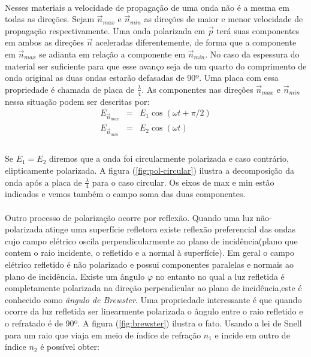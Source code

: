 \documentclass[a4paper,11pt]{article}
\begin{document}
\paragraph{}Nesses materiais a velocidade de propagação de uma onda não é a mesma em todas as direções. Sejam $\vec{n}_{max}$ e $\vec{n}_{min}$ as direções de maior e menor velocidade de propagação respectivamente. Uma onda polarizada em $\vec{p}$ terá suas componentes em ambos as direções $\vec{n}$ aceleradas diferentemente, de forma que a componente em $\vec{n}_{max}$ se adianta em relação a componente em  $\vec{n}_{min}$. No caso da espessura do material ser suficiente para que esse avanço seja de um quarto do comprimento de onda original as duas ondas estarão defasadas de 90º. Uma placa com essa propriedade é chamada de placa de $\frac{\lambda}{4}$. As componentes nas direções $\vec{n}_{max}$ e $\vec{n}_{min}$ 	nessa situação podem ser descritas por:
\begin{equation}
	\begin{array}{rcl}
		E_{\vec{n}_{max}} & = & E_1 \cos (\omega t + \pi/2) \\
		E_{\vec{n}_{min}} & = & E_2 \cos (\omega t) \\
	\end{array}
\end{equation}
\paragraph{}Se $E_1 = E_2$ diremos que a onda foi circularmente polarizada e caso contrário, elipticamente polarizada. A figura (\ref{fig:pol-circular}) ilustra a decomposição da onda após a placa de $ \frac{\lambda}{4}$ para o caso circular. Os eixos de max e min estão indicados e vemos também o campo soma das duas componentes.

\paragraph{}Outro processo de polarização ocorre por reflexão. Quando uma luz não-polarizada atinge uma superfície refletora existe reflexão preferencial das ondas cujo campo elétrico oscila perpendicularmente ao plano de incidência(plano que contem o raio incidente, o refletido e a normal à superfície). Em geral o campo elétrico refletido é não polarizado e possui componentes paralelas e normais ao plano  de incidência. Existe um ângulo $\varphi$ no entanto no qual a luz refletida é completamente polarizada na direção perpendicular ao plano de incidência,este é conhecido como \emph{ângulo de Brewster}. Uma propriedade interessante é que quando ocorre da luz refletida ser linearmente polarizada o ângulo entre o raio refletido e o refratado é de 90º. A figura (\ref{fig:brewster}) ilustra o fato. Usando a lei de Snell para um raio que viaja em meio de índice de refração $n_1$ e incide em outro de índice $n_2$ é possível obter:
\end{document}
